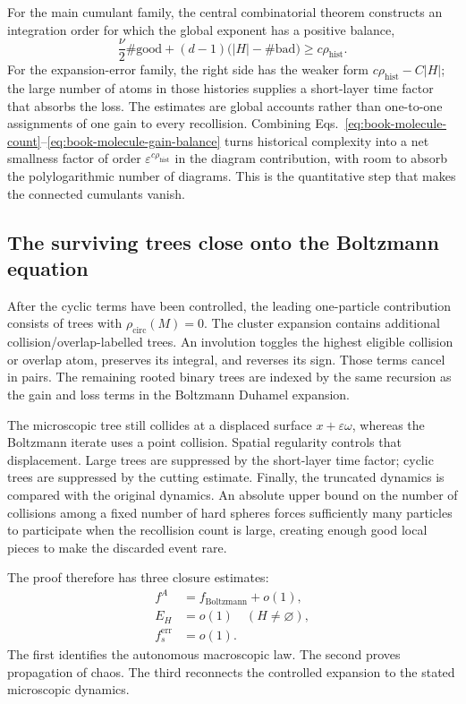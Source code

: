 For the main cumulant family, the central combinatorial theorem constructs an integration order
for which the global exponent has a positive balance,
\begin{equation}
\frac{\nu}{2}\#\mathrm{good}
+(d-1)\bigl(|H|-\#\mathrm{bad}\bigr)
\geq c\rho_{\mathrm{hist}}.
\label{eq:book-molecule-gain-balance}
\end{equation}
For the expansion-error family, the right side has the weaker form
$c\rho_{\mathrm{hist}}-C|H|$; the large number of atoms in those histories supplies a short-layer
time factor that absorbs the loss.  The estimates are global accounts rather than one-to-one
assignments of one gain to every recollision.  Combining
Eqs.~\ref{eq:book-molecule-count}--\ref{eq:book-molecule-gain-balance} turns historical complexity
into a net smallness factor of order $\varepsilon^{c\rho_{\mathrm{hist}}}$ in the diagram
contribution, with room to absorb the polylogarithmic number of diagrams.  This is the quantitative
step that makes the connected cumulants vanish.

\subsection{The surviving trees close onto the Boltzmann equation}

After the cyclic terms have been controlled, the leading one-particle contribution consists of
trees with $\rho_{\mathrm{circ}}(M)=0$.  The cluster expansion contains additional
collision/overlap-labelled trees.
An involution toggles the highest eligible collision or overlap atom, preserves its integral, and
reverses its sign.  Those terms cancel in pairs.  The remaining rooted binary trees are indexed by
the same recursion as the gain and loss terms in the Boltzmann Duhamel expansion.

The microscopic tree still collides at a displaced surface $x+\varepsilon\omega$, whereas the
Boltzmann iterate uses a point collision.  Spatial regularity controls that displacement.  Large
trees are suppressed by the short-layer time factor; cyclic trees are suppressed by the cutting
estimate.  Finally, the truncated dynamics is compared with the original dynamics.  An absolute
upper bound on the number of collisions among a fixed number of hard spheres forces sufficiently
many particles to participate when the recollision count is large, creating enough good local
pieces to make the discarded event rare.

The proof therefore has three closure estimates:
\begin{equation}
\boxed{
\begin{aligned}
f^A&=f_{\mathrm{Boltzmann}}+o(1),\\
E_H&=o(1)\quad(H\ne\varnothing),\\
f_s^{\mathrm{err}}&=o(1).
\end{aligned}}
\label{eq:book-three-boltzmann-closures}
\end{equation}
The first identifies the autonomous macroscopic law.  The second proves propagation of chaos.
The third reconnects the controlled expansion to the stated microscopic dynamics.

